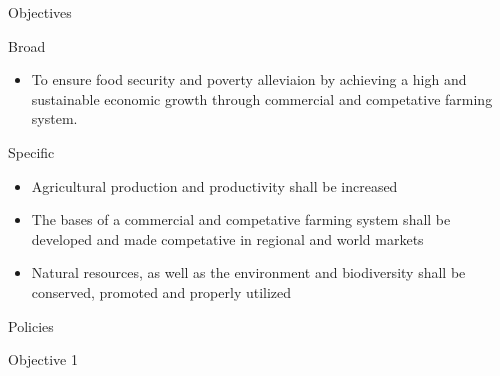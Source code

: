 \documentclass[
  openany]{book}
\providecommand{\tightlist}{%
  \setlength{\itemsep}{0pt}\setlength{\parskip}{0pt}}
\begin{document}
Objectives

Broad

\begin{itemize}
\tightlist
\item
  To ensure food security and poverty alleviaion by achieving a high and sustainable economic growth through commercial and competative farming system.
\end{itemize}

Specific

\begin{itemize}
\tightlist
\item
  Agricultural production and productivity shall be increased
\item
  The bases of a commercial and competative farming system shall be developed and made competative in regional and world markets
\item
  Natural resources, as well as the environment and biodiversity shall be conserved, promoted and properly utilized
\end{itemize}

Policies

Objective 1
\end{document}
